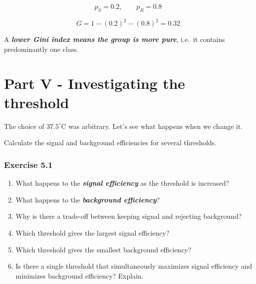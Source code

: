 \documentclass[10pt]{article}
\begin{document}
\[
p_S=0.2,\qquad p_B=0.8
\]

\[
G=1-(0.2)^2-(0.8)^2
={0.32}
\]

A \textbf{\textit{lower Gini index means the group is more pure}}, i.e. it contains predominantly one class.

\par\endgroup

\clearpage
\section*{Part V - Investigating the threshold}
The choice of $37.5^\circ\mathrm{C}$ was arbitrary. Let's see what happens when we change it.

Calculate the signal and background efficiencies for several thresholds.

\subsubsection*{Exercise 5.1}
\begin{enumerate}
\item
What happens to the \textbf{\textit{signal efficiency}} as the threshold is increased?

\item
What happens to the \textbf{\textit{background efficiency}}?

\item
Why is there a trade-off between keeping signal and rejecting background?

\item
Which threshold gives the largest signal efficiency?

\item
Which threshold gives the smallest background efficiency?

\item
Is there a single threshold that simultaneously maximizes signal efficiency and minimizes background efficiency? Explain.

\end{enumerate}
\begingroup\color{red}
\end{document}
